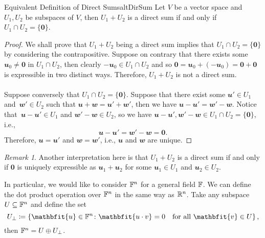 \documentclass[math, code]{amznotes}
\theoremstyle{remark}
\newtheorem*{remark}{Remark}
\newcommand{\zero}{\mathbf{0}}
\begin{document}
\begin{thmbox}{Equivalent Definition of Direct Sums}{altDirSum}
    Let $V$ be a vector space and $U_1, U_2$ be subspaces of $V$, then $U_1 + U_2$ is a direct sum if and only if $U_1 \cap U_2 = \{\zero\}$.
    \tcblower
    \begin{proof}
        We shall prove that $U_1 + U_2$ being a direct sum implies that $U_1 \cap U_2 = \{\zero\}$ by considering the contrapositive. Suppose on contrary that there exists some $\mathbfit{u_0 \neq \zero}$ in $U_1 \cap U_2$, then clearly $-\mathbfit{u}_0 \in U_1 \cap U_2$ and so $\zero = \mathbfit{u}_0 + \left(-\mathbfit{u}_0\right) = \zero + \zero$ is expressible in two distinct ways. Therefore, $U_1 + U_2$ is not a direct sum.
        \\\\
        Suppose conversely that $U_1 \cap U_2 = \{\zero\}$. Suppose that there exist some $\mathbfit{u}' \in U_1$ and~$\mathbfit{w}' \in U_2$ such that $\mathbfit{u + w} = \mathbfit{u}' + \mathbfit{w}'$, then we have $\mathbfit{u - u}' = \mathbfit{w}' - \mathbfit{w}$. Notice that~$\mathbfit{u - u}' \in U_1$ and $\mathbfit{w}' - \mathbfit{w} \in U_2$, so we have $\mathbfit{u - u}', \mathbfit{w}' - \mathbfit{w} \in U_1 \cap U_2 = \{\zero\}$, i.e.,
        \begin{equation*}
            \mathbfit{u - u}' = \mathbfit{w}' - \mathbfit{w} = \zero.
        \end{equation*} 
        Therefore, $\mathbfit{u} = \mathbfit{u}'$ and $\mathbfit{w} = \mathbfit{w}'$, i.e., $\mathbfit{u}$ and $\mathbfit{w}$ are unique.
    \end{proof}
\end{thmbox}
\begin{notebox}
    \begin{remark}
        Another interpretation here is that $U_1 + U_2$ is a direct sum if and only if $\zero$ is uniquely expressible as $\mathbfit{u}_1 + \mathbfit{u}_2$ for some $\mathbfit{u}_1 \in U_1$ and $\mathbfit{u}_2 \in U_2$.
    \end{remark}
\end{notebox}
In particular, we would like to consider $\mathbb{F}^n$ for a general field $\mathbb{F}$. We can define the dot product operation over $\mathbb{F}^n$ in the same way as $\mathbb{R}^n$. Take any subspace $U \subseteq \mathbb{F}^n$ and define the set
\begin{equation*}
    U_{\perp} \coloneqq \left\{\mathbfit{u} \in \F^n \colon \mathbfit{u \cdot v} = 0 \quad\textrm{for all } \mathbfit{v} \in U\right\},
\end{equation*}
then $\mathbb{F}^n = U \oplus U_{\perp}$.
\end{document}
